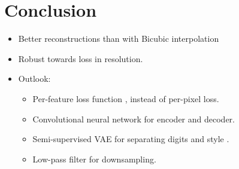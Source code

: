 \section{Conclusion} \label{sec:conclusion}

\begin{itemize}
	\item Better reconstructions than with Bicubic interpolation
	\item Robust towards loss in resolution.
	\item Outlook:
	\begin{itemize}
		\item Per-feature loss function \cite{Johnson16}, instead of per-pixel loss.
		\item Convolutional neural network for encoder and decoder.
		\item Semi-supervised VAE for separating digits and style \cite{Kingma2014}.
		\item Low-pass filter for downsampling.
	\end{itemize}
\end{itemize}

